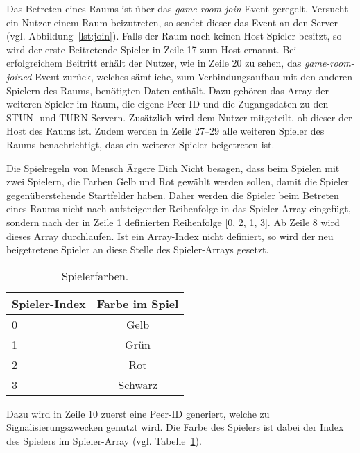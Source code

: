 Das Betreten eines Raums ist über das \textit{game-room-join}-Event geregelt. Versucht ein Nutzer einem Raum beizutreten, so sendet dieser das Event an den Server (vgl. Abbildung~\ref{lst:join}). Falls der Raum noch keinen Host-Spieler besitzt, so wird der erste Beitretende Spieler in Zeile 17 zum Host ernannt. Bei erfolgreichem Beitritt erhält der Nutzer, wie in Zeile 20 zu sehen, das \textit{game-room-joined}-Event zurück, welches sämtliche, zum Verbindungsaufbau mit den anderen Spielern des Raums, benötigten Daten enthält. Dazu gehören das Array der weiteren Spieler im Raum, die eigene Peer-ID und die Zugangsdaten zu den \acs{STUN}- und \acs{TURN}-Servern. Zusätzlich wird dem Nutzer mitgeteilt, ob dieser der Host des Raums ist. Zudem werden in Zeile 27--29 alle weiteren Spieler des Raums benachrichtigt, dass ein weiterer Spieler beigetreten ist.\par

Die Spielregeln von \glqq{}Mensch Ärgere Dich Nicht\grqq{} besagen, dass beim Spielen mit zwei Spielern, die Farben Gelb und Rot gewählt werden sollen, damit die Spieler gegenüberstehende Startfelder haben. Daher werden die Spieler beim Betreten eines Raums nicht nach aufsteigender Reihenfolge in das Spieler-Array eingefügt, sondern nach der in Zeile 1 definierten Reihenfolge [0, 2, 1, 3]. Ab Zeile 8 wird dieses Array durchlaufen. Ist ein Array-Index nicht definiert, so wird der neu beigetretene Spieler an diese Stelle des Spieler-Arrays gesetzt.\par

\begin{table}[ht]
\centering
\begin{tabular}[t]{lc}
\toprule
Spieler-Index&Farbe im Spiel\\
\midrule
0&Gelb\\
1&Grün\\
2&Rot\\
3&Schwarz\\
\bottomrule
\end{tabular}
\caption{Spielerfarben.}
\label{table:playercolors}
\end{table}

Dazu wird in Zeile 10 zuerst eine Peer-ID generiert, welche zu Signalisierungszwecken genutzt wird. Die \glqq{}Farbe\grqq{} des Spielers ist dabei der Index des Spielers im Spieler-Array (vgl. Tabelle~\ref{table:playercolors}).\par


